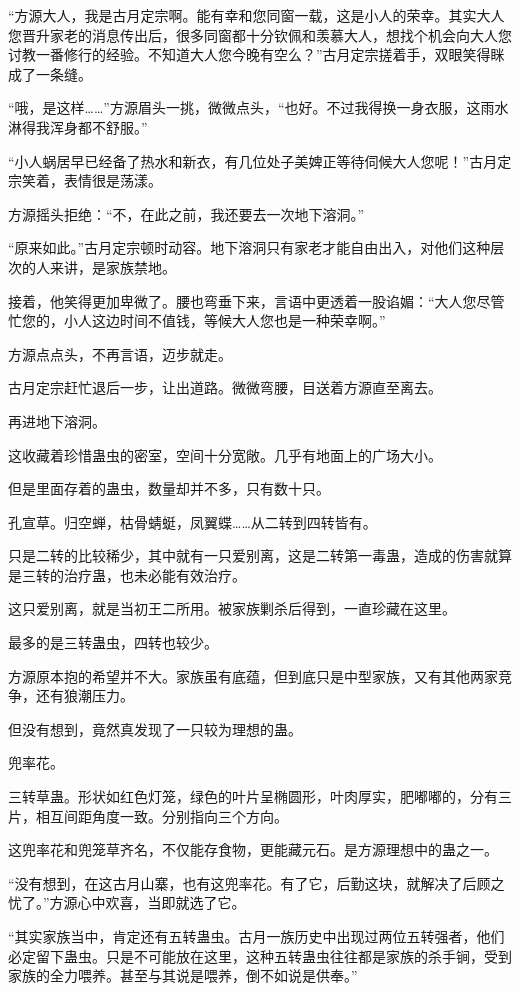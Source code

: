 \begin{this_body}
“方源大人，我是古月定宗啊。能有幸和您同窗一载，这是小人的荣幸。其实大人您晋升家老的消息传出后，很多同窗都十分钦佩和羡慕大人，想找个机会向大人您讨教一番修行的经验。不知道大人您今晚有空么？”古月定宗搓着手，双眼笑得眯成了一条缝。

“哦，是这样……”方源眉头一挑，微微点头，“也好。不过我得换一身衣服，这雨水淋得我浑身都不舒服。”

“小人蜗居早已经备了热水和新衣，有几位处子美婢正等待伺候大人您呢！”古月定宗笑着，表情很是荡漾。

方源摇头拒绝：“不，在此之前，我还要去一次地下溶洞。”

“原来如此。”古月定宗顿时动容。地下溶洞只有家老才能自由出入，对他们这种层次的人来讲，是家族禁地。

接着，他笑得更加卑微了。腰也弯垂下来，言语中更透着一股谄媚：“大人您尽管忙您的，小人这边时间不值钱，等候大人您也是一种荣幸啊。”

方源点点头，不再言语，迈步就走。

古月定宗赶忙退后一步，让出道路。微微弯腰，目送着方源直至离去。

再进地下溶洞。

这收藏着珍惜蛊虫的密室，空间十分宽敞。几乎有地面上的广场大小。

但是里面存着的蛊虫，数量却并不多，只有数十只。

孔宣草。归空蝉，枯骨蜻蜓，凤翼蝶……从二转到四转皆有。

只是二转的比较稀少，其中就有一只爱别离，这是二转第一毒蛊，造成的伤害就算是三转的治疗蛊，也未必能有效治疗。

这只爱别离，就是当初王二所用。被家族剿杀后得到，一直珍藏在这里。

最多的是三转蛊虫，四转也较少。

方源原本抱的希望并不大。家族虽有底蕴，但到底只是中型家族，又有其他两家竞争，还有狼潮压力。

但没有想到，竟然真发现了一只较为理想的蛊。

兜率花。

三转草蛊。形状如红色灯笼，绿色的叶片呈椭圆形，叶肉厚实，肥嘟嘟的，分有三片，相互间距角度一致。分别指向三个方向。

这兜率花和兜笼草齐名，不仅能存食物，更能藏元石。是方源理想中的蛊之一。

“没有想到，在这古月山寨，也有这兜率花。有了它，后勤这块，就解决了后顾之忧了。”方源心中欢喜，当即就选了它。

“其实家族当中，肯定还有五转蛊虫。古月一族历史中出现过两位五转强者，他们必定留下蛊虫。只是不可能放在这里，这种五转蛊虫往往都是家族的杀手锏，受到家族的全力喂养。甚至与其说是喂养，倒不如说是供奉。”


\end{this_body}
